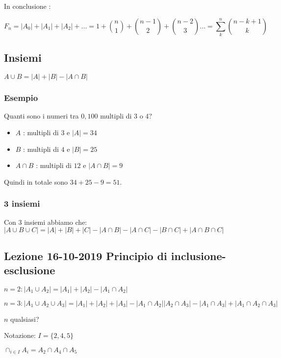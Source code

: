 \documentclass[11pt]{article}
\begin{document}
			In conclusione :

			\[
				F_n = |A_0| + |A_1| + |A_2| + \ldots =
				1 + \binom{n}{1} + \binom{n-1}{2} + \binom{n-2}{3} \ldots 
				= \sum_{k}^{n} \binom{n-k+1}{k}
			\]
			\subsection{Insiemi}

			$A \cup B = |A| + |B| - |A \cap B|$
			
			\subsubsection{Esempio}

			Quanti sono i numeri tra $0, 100$ multipli di $3$ o $4$?

			\begin{itemize}
			\item $A$ : multipli di $3$ e $|A| = 34$
			\item $B$ : multipli di $4$ e $|B| = 25$
			\item $A \cap B$ : multipli di $12$ e $|A \cap B| = 9$
			\end{itemize}
			
			Quindi in totale sono $34 + 25 - 9 = 51$.
			
			\subsubsection{3 insiemi}

			Con $3$ insiemi abbiamo che:\\

			$|A \cup B \cup C| = |A| + |B| + |C| 
			- |A \cap B| - |A \cap C| - |B \cap C|
			+ |A \cap B \cap C|$

		\subsection{Lezione 16-10-2019 Principio di inclusione-esclusione}

		$n=2 : |A_1 \cup A_2| = |A_1| + |A_2| - |A_1 \cap A_2|$

		$n=3 : |A_1 \cup A_2 \cup A_3| = |A_1| + |A_2| + |A_3| - |A_1 \cap A_2|
		|A_2 \cap A_3| - |A_1 \cap A_3| + |A_1 \cap A_2 \cap A_3|$
		
		$n$ qualsiasi?

		Notazione: $I = \{2,4,5\}$

		$\cap_{i \in I}A_i = A_2 \cap A_4 \cap A_5$
\end{document}
